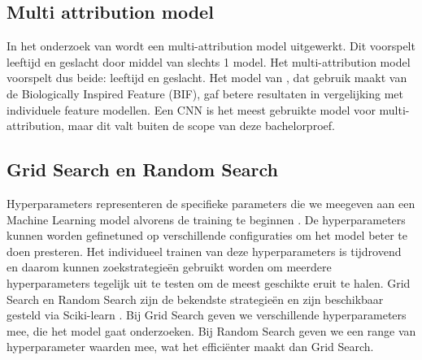 \subsection{Multi attribution model}\label{sub:mamodel}
In het onderzoek van \autocite{Gupta2022} wordt een multi-attribution model uitgewerkt. Dit voorspelt leeftijd en geslacht door middel van slechts 1 model. Het multi-attribution model voorspelt dus beide: leeftijd en geslacht. Het model van \autocite{Guo2014}, dat gebruik maakt van de Biologically Inspired Feature (BIF), gaf betere resultaten in vergelijking met individuele feature modellen. Een CNN is het meest gebruikte model voor multi-attribution, maar dit valt buiten de scope van deze bachelorproef.

\subsection{Grid Search en Random Search} \label{sub:gridsearch}
Hyperparameters representeren de specifieke parameters die we meegeven aan een Machine Learning model alvorens de training te beginnen \autocite{Ibtisamah2023}. De hyperparameters kunnen worden gefinetuned op verschillende configuraties om het model beter te doen presteren. Het individueel trainen van deze hyperparameters is tijdrovend en daarom kunnen zoekstrategieën gebruikt worden om meerdere hyperparameters tegelijk uit te testen om de meest geschikte eruit te halen. Grid Search en Random Search zijn de bekendste strategieën en zijn beschikbaar gesteld via Sciki-learn \autocite{scikitlearn2024}. Bij Grid Search geven we verschillende hyperparameters mee, die het model gaat onderzoeken. Bij Random Search geven we een range van hyperparameter waarden mee, wat het efficiënter maakt dan Grid Search.

